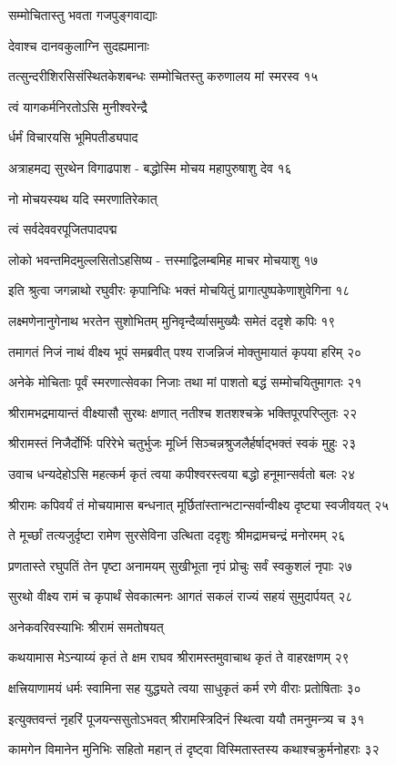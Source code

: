 सम्मोचितास्तु भवता गजपुङ्गवाद्याः

देवाश्च दानवकुलाग्नि सुदह्यमानाः

तत्सुन्दरीशिरसिसंस्थितकेशबन्धः
सम्मोचितस्तु करुणालय मां स्मरस्व १५

त्वं यागकर्मनिरतोऽसि मुनीश्वरेन्द्रै

र्धर्मं विचारयसि भूमिपतीड्यपाद

अत्राहमद्य सुरथेन विगाढपाश -
बद्धोस्मि मोचय महापुरुषाशु देव १६

नो मोचयस्यथ यदि स्मरणातिरेकात्

त्वं सर्वदेववरपूजितपादपद्म

लोको भवन्तमिदमुल्लसितोऽहसिष्य -
त्तस्माद्विलम्बमिह माचर मोचयाशु १७

इति श्रुत्वा जगन्नाथो रघुवीरः कृपानिधिः
भक्तं मोचयितुं प्रागात्पुष्पकेणाशुवेगिना १८

लक्ष्मणेनानुगेनाथ भरतेन सुशोभितम्
मुनिवृन्दैर्व्यासमुख्यैः समेतं ददृशे कपिः १९

तमागतं निजं नाथं वीक्ष्य भूपं समब्रवीत्
पश्य राजन्निजं मोक्तुमायातं कृपया हरिम् २०

अनेके मोचिताः पूर्वं स्मरणात्सेवका निजाः
तथा मां पाशतो बद्धं सम्मोचयितुमागतः २१

श्रीरामभद्रमायान्तं वीक्ष्यासौ सुरथः क्षणात्
नतीश्च शतशश्चक्रे भक्तिपूरपरिप्लुतः २२

श्रीरामस्तं निजैर्दोर्भिः परिरेभे चतुर्भुजः
मूर्ध्नि सिञ्चन्नश्रुजलैर्हर्षाद्भक्तं स्वकं मुहुः २३

उवाच धन्यदेहोऽसि महत्कर्म कृतं त्वया
कपीश्वरस्त्वया बद्धो हनूमान्सर्वतो बलः २४

श्रीरामः कपिवर्यं तं मोचयामास बन्धनात्
मूर्छितांस्तान्भटान्सर्वान्वीक्ष्य दृष्ट्या स्वजीवयत् २५

ते मूर्च्छां तत्यजुर्दृष्टा रामेण सुरसेविना
उत्थिता ददृशुः श्रीमद्रामचन्द्रं मनोरमम् २६

प्रणतास्ते रघुपतिं तेन पृष्टा अनामयम्
सुखीभूता नृपं प्रोचुः सर्वं स्वकुशलं नृपाः २७

सुरथो वीक्ष्य रामं च कृपार्थं सेवकात्मनः
आगतं सकलं राज्यं सहयं सुमुदार्पयत् २८

अनेकवरिवस्याभिः श्रीरामं समतोषयत्

कथयामास मेऽन्याय्यं कृतं ते क्षम राघव
श्रीरामस्तमुवाचाथ कृतं ते वाहरक्षणम् २९

क्षत्त्रियाणामयं धर्मः स्वामिना सह युद्ध्यते
त्वया साधुकृतं कर्म रणे वीराः प्रतोषिताः ३०

इत्युक्तवन्तं नृहरिं पूजयन्ससुतोऽभवत्
श्रीरामस्त्रिदिनं स्थित्वा ययौ तमनुमन्त्र्य च ३१

कामगेन विमानेन मुनिभिः सहितो महान्
तं दृष्ट्वा विस्मितास्तस्य कथाश्चक्रुर्मनोहराः ३२

